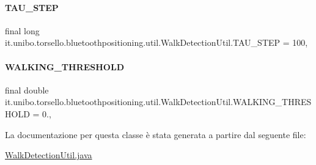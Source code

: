 \hypertarget{classit_1_1unibo_1_1torsello_1_1bluetoothpositioning_1_1util_1_1WalkDetectionUtil_ab5ae731e91530d10bde22bec4c223a8f_ab5ae731e91530d10bde22bec4c223a8f}{}\label{classit_1_1unibo_1_1torsello_1_1bluetoothpositioning_1_1util_1_1WalkDetectionUtil_ab5ae731e91530d10bde22bec4c223a8f_ab5ae731e91530d10bde22bec4c223a8f} 
\paragraph{\texorpdfstring{T\+A\+U\+\_\+\+S\+T\+EP}{TAU\_STEP}}
{\footnotesize\ttfamily final long it.\+unibo.\+torsello.\+bluetoothpositioning.\+util.\+Walk\+Detection\+Util.\+T\+A\+U\+\_\+\+S\+T\+EP = 100\hspace{0.3cm}{\ttfamily [static]}, {\ttfamily [private]}}

\hypertarget{classit_1_1unibo_1_1torsello_1_1bluetoothpositioning_1_1util_1_1WalkDetectionUtil_acb342863aac2cb0746674b64faad451d_acb342863aac2cb0746674b64faad451d}{}\label{classit_1_1unibo_1_1torsello_1_1bluetoothpositioning_1_1util_1_1WalkDetectionUtil_acb342863aac2cb0746674b64faad451d_acb342863aac2cb0746674b64faad451d} 
\paragraph{\texorpdfstring{W\+A\+L\+K\+I\+N\+G\+\_\+\+T\+H\+R\+E\+S\+H\+O\+LD}{WALKING\_THRESHOLD}}
{\footnotesize\ttfamily final double it.\+unibo.\+torsello.\+bluetoothpositioning.\+util.\+Walk\+Detection\+Util.\+W\+A\+L\+K\+I\+N\+G\+\_\+\+T\+H\+R\+E\+S\+H\+O\+LD = 0.\hspace{0.3cm}{\ttfamily [static]}, {\ttfamily [private]}}



La documentazione per questa classe è stata generata a partire dal seguente file\+:\begin{DoxyCompactItemize}
\item 
\hyperlink{WalkDetectionUtil_8java}{Walk\+Detection\+Util.\+java}\end{DoxyCompactItemize}
